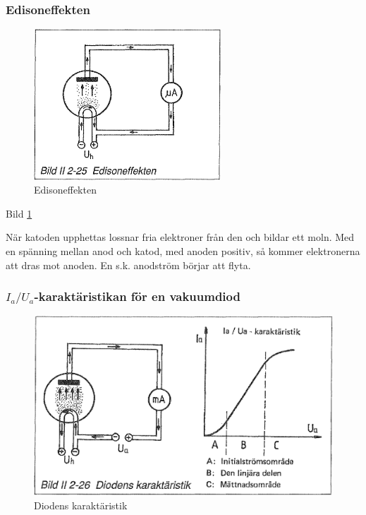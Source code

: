 \subsubsection{Edisoneffekten}

\begin{figure}[h]
\begin{center}
\includegraphics[width=7cm]{images/bild_2_2-25}
\caption{Edisoneffekten}
\label{fig:BildII2-25}
\end{center}
\end{figure}

Bild \ref{fig:BildII2-25}

När katoden upphettas lossnar fria elektroner från den och bildar ett moln. Med
en spänning mellan anod och katod, med anoden positiv, så kommer elektronerna
att dras mot anoden. En s.k. anodström börjar att flyta.

\subsubsection{\(I_a/U_a\)-karaktäristikan för en vakuumdiod}

\begin{figure}[h]
\begin{center}
\includegraphics[width=14cm]{images/bild_2_2-26}
\caption{Diodens karaktäristik}
\label{fig:BildII2-26}
\end{center}
\end{figure}

